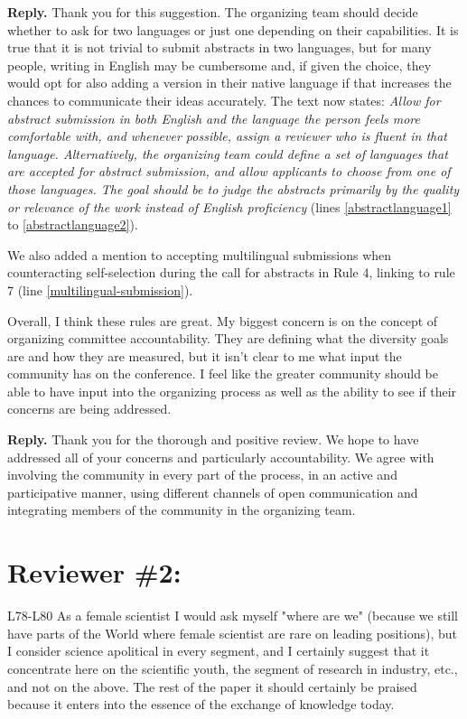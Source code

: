 \documentclass{article}
\newenvironment{Reply}{\noindent\color{BlueViolet}\textbf{Reply.}}{\vspace{1em}}
\begin{document}
\begin{Reply}
    Thank you for this suggestion. 
    The organizing team should decide whether to ask for two languages or just one depending on their capabilities. 
    It is true that it is not trivial to submit abstracts in two languages, but for many people, writing in English may be cumbersome and, if given the choice, they would opt for also adding a version in their native language if that increases the chances to communicate their ideas accurately. 
    The text now states: 
    \textit{Allow for abstract submission in both English and the language the person feels more comfortable with, and whenever possible, assign a reviewer who is fluent in that language. 
    Alternatively, the organizing team could define a set of languages that are accepted for abstract submission, and allow applicants to choose from one of those languages. 
    The goal should be to judge the abstracts primarily by the quality or relevance of the work instead of English proficiency} (lines \ref{abstractlanguage1} to \ref{abstractlanguage2}).
    
    We also added a mention to accepting multilingual submissions when counteracting self-selection during the call for abstracts in Rule 4, linking to rule 7 (line \ref{multilingual-submission}).
\end{Reply}

Overall, I think these rules are great. My biggest concern is on the concept of organizing committee accountability. They are defining what the diversity goals are and how they are measured, but it isn't clear to me what input the community has on the conference. I feel like the greater community should be able to have input into the organizing process as well as the ability to see if their concerns are being addressed.


\begin{Reply}
    Thank you for the thorough and positive review. We hope to have addressed all of your concerns and particularly accountability. We agree with involving the community in every part of the process, in an active and participative manner, using different channels of open communication and integrating members of the community in the organizing team. 
\end{Reply}


\section*{Reviewer \#2:}
L78-L80 As a female scientist I would ask myself "where are we" (because we still have parts of the World where female scientist are rare on leading positions), but I consider science apolitical in every segment, and I certainly suggest that it concentrate here on the scientific youth, the segment of research in industry, etc., and not on the above.
The rest of the paper it should certainly be praised because it enters into the essence of the exchange of knowledge today.
\end{document}
